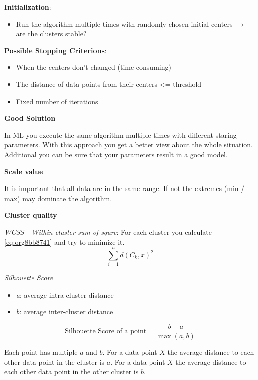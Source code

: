 \documentclass[11pt,landscape]{article}
\begin{document}
\begin{multicols}{3}
\textbf{Initialization}:

\begin{itemize}
\item Run the algorithm multiple times with randomly chosen initial centers \(\rightarrow\) are the clusters stable?
\end{itemize}


\textbf{Possible Stopping Criterions}:

\begin{itemize}
\item When the centers don't changed (time-consuming)
\item The distance of data points from their centers <= threshold
\item Fixed number of iterations
\end{itemize}


\textbf{Good Solution}

In ML you execute the same algorithm multiple times with different staring parameters.
With this approach you get a better view about the whole situation.
Additional you can be sure that your parameters result in a good model.


\textbf{Scale value}

It is important that all data are in the same range.
If not the extremes (min / max) may dominate the algorithm.


\textbf{Cluster quality}

\emph{WCSS - Within-cluster sum-of-squre}: For each cluster you calculate \ref{eq:org8bb8741} and try to minimize it.
\begin{equation}
\label{eq:org8bb8741}
\sum_{i=1}^n d(C_k, x)^2
\end{equation}

\emph{Silhouette Score}
\begin{itemize}
\item \emph{a}: average intra-cluster distance
\item \emph{b}: average inter-cluster distance
\end{itemize}
\begin{equation}
  \text{Silhouette Score of a point} = \frac{b-a}{\max(a,b)}
\end{equation}

Each point has multiple \(a\) and \(b\).
For a data point \(X\) the average distance to each other data point in the cluster is \(a\).
For a data point \(X\) the average distance to each other data point in the other cluster is \(b\).



\end{multicols}
\end{document}
